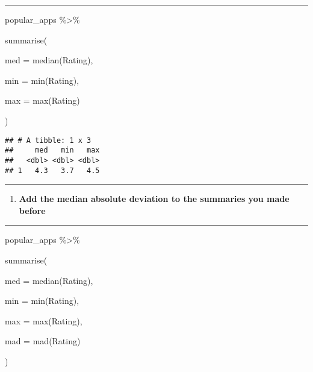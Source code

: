\documentclass[
]{article}
\newenvironment{Shaded}{\begin{snugshade}}{\end{snugshade}}
\newcommand{\AttributeTok}[1]{\textcolor[rgb]{0.77,0.63,0.00}{#1}}
\newcommand{\FunctionTok}[1]{\textcolor[rgb]{0.00,0.00,0.00}{#1}}
\newcommand{\NormalTok}[1]{#1}
\newcommand{\SpecialCharTok}[1]{\textcolor[rgb]{0.00,0.00,0.00}{#1}}
\providecommand{\tightlist}{%
  \setlength{\itemsep}{0pt}\setlength{\parskip}{0pt}}
\begin{document}
\begin{center}\rule{0.5\linewidth}{0.5pt}\end{center}

\begin{Shaded}
\begin{Highlighting}[]
\NormalTok{popular\_apps }\SpecialCharTok{\%\textgreater{}\%}

  \FunctionTok{summarise}\NormalTok{(}

    \AttributeTok{med =} \FunctionTok{median}\NormalTok{(Rating),}

    \AttributeTok{min =} \FunctionTok{min}\NormalTok{(Rating),}

    \AttributeTok{max =} \FunctionTok{max}\NormalTok{(Rating)}

\NormalTok{  )}
\end{Highlighting}
\end{Shaded}

\begin{verbatim}
## # A tibble: 1 x 3
##     med   min   max
##   <dbl> <dbl> <dbl>
## 1   4.3   3.7   4.5
\end{verbatim}

\begin{center}\rule{0.5\linewidth}{0.5pt}\end{center}

\begin{enumerate}
\def\labelenumi{\arabic{enumi}.}
\setcounter{enumi}{17}
\tightlist
\item
  \textbf{Add the median absolute deviation to the summaries you made
  before}
\end{enumerate}

\begin{center}\rule{0.5\linewidth}{0.5pt}\end{center}

\begin{Shaded}
\begin{Highlighting}[]
\NormalTok{popular\_apps }\SpecialCharTok{\%\textgreater{}\%}

  \FunctionTok{summarise}\NormalTok{(}

    \AttributeTok{med =} \FunctionTok{median}\NormalTok{(Rating),}

    \AttributeTok{min =} \FunctionTok{min}\NormalTok{(Rating),}

    \AttributeTok{max =} \FunctionTok{max}\NormalTok{(Rating),}

    \AttributeTok{mad =} \FunctionTok{mad}\NormalTok{(Rating)}

\NormalTok{  )}
\end{Highlighting}
\end{Shaded}
\end{document}
